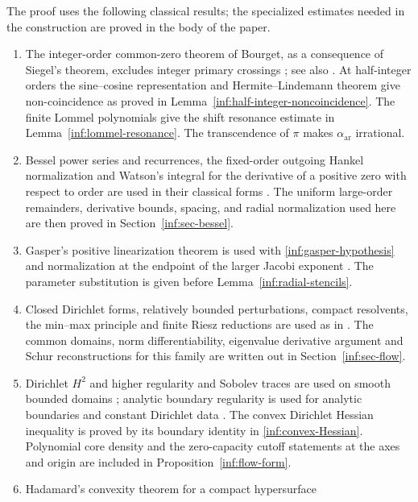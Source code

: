 The proof uses the following classical results; the specialized
estimates needed in the construction
are proved in the body of the paper.
\begin{enumerate}[label=\textup{(\arabic*)}]
\item The integer-order common-zero theorem of Bourget, as a
consequence of Siegel's theorem, excludes integer primary
crossings \cite[\S15.28]{inf:watson}; see also
\cite{inf:siegel}. At half-integer orders the sine--cosine
representation and Hermite--Lindemann theorem
\cite[\S1.2]{inf:BakerWustholz} give non-coincidence as proved in
Lemma~\ref{inf:half-integer-noncoincidence}.
The finite Lommel polynomials \cite{inf:watson} give the
shift resonance estimate in Lemma~\ref{inf:lommel-resonance}.
The transcendence of $\pi$
\cite{inf:lindemann} makes $\alpha_{\mathrm{ar}}$ irrational.
\item Bessel power series and recurrences, the fixed-order outgoing Hankel
normalization and Watson's integral for the derivative of a
positive zero with respect to order are used in their classical
forms \cite[\S\S10.2, 10.6, 10.17; Eq.~10.21.17]{inf:dlmf}.
The uniform large-order remainders, derivative bounds, spacing,
and radial normalization used here are then proved in
Section~\ref{inf:sec-bessel}.
\item Gasper's positive linearization theorem is used with
\eqref{inf:gasper-hypothesis} and normalization at the endpoint of
the larger Jacobi exponent \cite[Theorem~1]{inf:gasper}.
The parameter substitution is given before
Lemma~\ref{inf:radial-stencils}.
\item Closed Dirichlet forms, relatively bounded perturbations,
compact resolvents, the min--max principle and finite Riesz
reductions are used as in \cite[Chs.~II and IV--VII]{inf:kato}.
The common domains, norm differentiability, eigenvalue derivative
argument and Schur reconstructions for this family are written
out in Section~\ref{inf:sec-flow}.
\item Dirichlet $H^2$ and higher regularity and Sobolev traces are
used on smooth bounded domains \cite[Chs.~6--9]{inf:GT}; analytic
boundary regularity is used for analytic boundaries and constant
Dirichlet data \cite{inf:MorreyNirenberg,inf:MorreyBoundary}.
The convex Dirichlet Hessian inequality is proved by its boundary
identity in \eqref{inf:convex-Hessian}. Polynomial core density
and the zero-capacity cutoff statements at the axes and origin
are included in Proposition~\ref{inf:flow-form}.
\item Hadamard's convexity theorem for a compact hypersurface

\end{enumerate}
